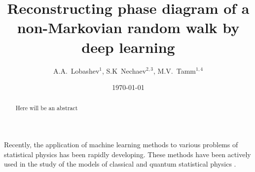 \documentclass[aps,a4paper,twocolumn,showpacs]{revtex4}
\begin{document}

\title{Reconstructing phase diagram of a non-Markovian random walk by deep learning}


\author{A.A.~Lobashev$^{1}$, S.K~Nechaev$^{2,3}$, M.V.~Tamm$^{1,4}$}


\date{\today}

\begin{abstract}
Here will be an abstract
\end{abstract}


\maketitle

\par Recently, the application of machine learning methods to various problems of statistical physics has been rapidly developing. These methods have been actively used in the study of the models of classical and quantum statistical physics \cite{phase_transitions_by_confusion, carrasquilla, ml_topological_phase_transitions, ml_quantum_phase_transitions, ml_hubbard_model, pca_and_vae_ising_model}. 
\end{document}
